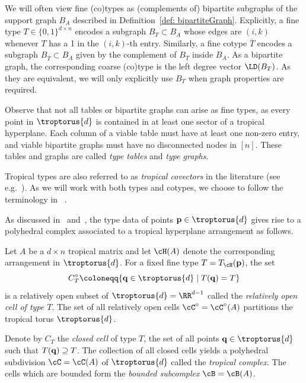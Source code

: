 \begin{notation}\label{not: typesAsGraphs}
We will often view fine (co)types as (complements of) bipartite subgraphs of the support graph $B_A$ described in Definition~\ref{def: bipartiteGraph}. Explicitly, a fine type $T \in \{0,1\}^{d\times n}$ encodes a subgraph $B_T \subset B_A$ whose edges are $(i,k)$ whenever $T$ has a 1 in the $(i,k)$-th entry.
Similarly, a fine cotype $\overline{T}$ encodes a subgraph $B_{\overline{T}}\subset B_A$ given by the complement of $B_T$ inside $B_A$.
As a bipartite graph, the corresponding coarse (co)type is the left degree vector $\LD(B_T)$.
As they are equivalent, we will only explicitly use $B_T$ when graph properties are required.
\end{notation}

Observe that not all tables or bipartite graphs can arise as fine types, as every point in $\troptorus{d}$ is contained in at least one sector of a tropical hyperplane.
Each column of a viable table must have at least one non-zero entry, and viable bipartite graphs must have no disconnected nodes in $[n]$.
These tables and graphs are called \emph{type tables} and \emph{type graphs}.

\begin{remark}
Tropical types are also referred to as \textit{tropical covectors} in the literature (see e.g.~\cite{fink2015stiefel}). As we will work with both types and cotypes, we choose to follow the terminology in~\cite{dochtermann2012tropical} .
\end{remark}

As discussed in~\cite{develin2004tropical} and~\cite{JoswigLoho:2016}, 
the type data of points ${\bf p} \in \troptorus{d}$ gives rise to a polyhedral complex associated to a tropical hyperplane arrangement as follows.

\begin{definition}\label{def: cells} Let $A$ be a $d \times n$ tropical matrix and let $\cH(A)$ denote the corresponding arrangement in $\troptorus{d}$. For a fixed fine type $T = T_\cH({\bf p})$, the set
$$
C^\circ_T \coloneqq \{{\bf q}\in\troptorus{d}\mid T({\bf q}) = T\}
$$
is a relatively open subset of $\troptorus{d} = \RR^{d-1}$ called the \emph{relatively open cell of type $T$}. The set of all relatively open cells $\cC^\circ = \cC^\circ(A)$ partitions the tropical torus $\troptorus{d}$.

Denote by $C_T$ the \emph{closed cell} of type $T$, the set of all points ${\bf q} \in \troptorus{d}$ such that $T({\bf q}) \supseteq T$.
The collection of all closed cells yields a polyhedral subdivision $\cC = \cC(A)$ of $\troptorus{d}$ called the \emph{tropical complex}.
The cells which are bounded form the \emph{bounded subcomplex} $\cB = \cB(A)$. 
\end{definition}

